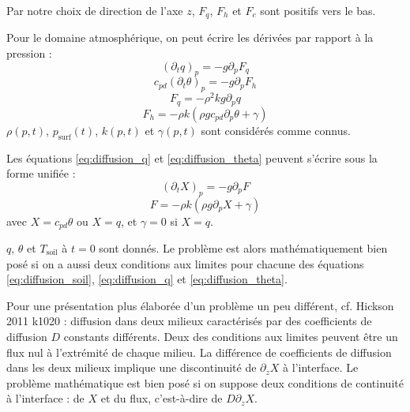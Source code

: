 \documentclass[a4paper,english,french]{article}
\begin{document}
Par notre choix de direction de l'axe $z$, $F_q$, $F_h$ et $F_c$ sont
positifs vers le bas.

Pour le domaine atmosphérique, on peut écrire les dérivées par rapport
à la pression :
\begin{equation}
  \label{eq:diffusion_q}
  (\partial_t q)_p = - g \partial_p F_q
\end{equation}
\begin{equation}
  \label{eq:diffusion_theta}
  c_{pd} (\partial_t \theta)_p = - g \partial_p F_h
\end{equation}
\begin{equation*}
  F_q = - \rho^2 k g \partial_p q
\end{equation*}
\begin{equation*}
  F_h = - \rho k (\rho g c_{pd} \partial_p \theta + \gamma)
\end{equation*}
$\rho(p, t)$, $p_\mathrm{surf}(t)$, $k(p, t)$ et $\gamma(p, t)$ sont
considérés comme connus.

Les équations \ref{eq:diffusion_q} et \ref{eq:diffusion_theta} peuvent
s'écrire sous la forme unifiée :
\begin{equation}
  \label{eq:diffusion_X}
  (\partial_t X)_p = - g \partial_p F
\end{equation}
\begin{equation*}
  F = - \rho k (\rho g \partial_p X + \gamma)
\end{equation*}
avec $X = c_{pd} \theta$ ou $X = q$, et $\gamma = 0$ si $X = q$.

$q$, $\theta$ et $T_\mathrm{soil}$ à $t = 0$ sont donnés. Le problème
est alors mathématiquement bien posé si on a aussi deux conditions aux
limites pour chacune des équations \ref{eq:diffusion_soil},
\ref{eq:diffusion_q} et \ref{eq:diffusion_theta}.

Pour une présentation plus élaborée d'un problème un peu différent,
cf. Hickson 2011 k1020 : diffusion dans deux milieux caractérisés par
des coefficients de diffusion $D$ constants différents. Deux des
conditions aux limites peuvent être un flux nul à l'extrémité de
chaque milieu. La différence de coefficients de diffusion dans les
deux milieux implique une discontinuité de $\partial_z X$ à
l'interface. Le problème mathématique est bien posé si on suppose deux
conditions de continuité à l'interface : de $X$ et du flux,
c'est-à-dire de $D \partial_z X$.
\end{document}
